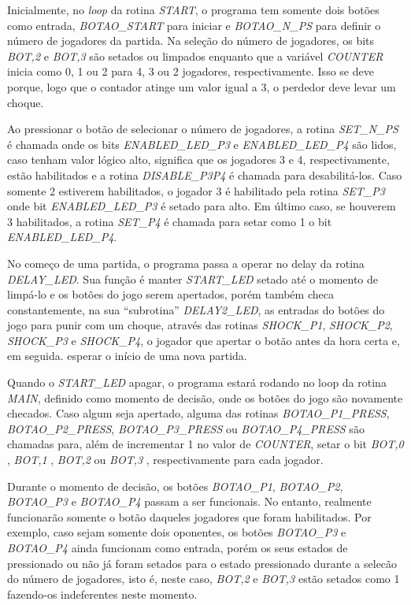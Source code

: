 \documentclass[article]{IEEEtran}
\begin{document}
Inicialmente, no \textit{loop} da rotina \textit{START}, o programa tem somente dois botões como entrada, \textit{BOTAO\_START} para iniciar e \textit{BOTAO\_N\_PS} para definir o número de jogadores da partida. Na seleção do número de jogadores, os bits \textit{BOT,2} e \textit{BOT,3} são setados ou limpados enquanto que a variável \textit{COUNTER} inicia como 0, 1 ou 2 para 4, 3 ou 2 jogadores, respectivamente. Isso se deve porque, logo que o contador atinge um valor igual a 3, o perdedor deve levar um choque.

Ao pressionar o botão de selecionar o número de jogadores, a rotina \textit{SET\_N\_PS} é chamada onde os bits \textit{ENABLED\_LED\_P3} e \textit{ENABLED\_LED\_P4} são lidos, caso tenham valor lógico alto, significa que os jogadores 3 e 4, respectivamente, estão habilitados e a rotina \textit{DISABLE\_P3P4} é chamada para desabilitá-los. Caso somente 2 estiverem habilitados, o jogador 3 é habilitado pela rotina \textit{SET\_P3} onde bit \textit{ENABLED\_LED\_P3} é setado para alto. Em último caso, se houverem 3 habilitados, a rotina \textit{SET\_P4} é chamada para setar como 1 o bit \textit{ENABLED\_LED\_P4}.

No começo de uma partida, o programa passa a operar no delay da rotina \textit{DELAY\_LED}. Sua função é manter \textit{START\_LED} setado até o momento de limpá-lo e os botões do jogo serem apertados, porém também checa constantemente, na sua ``subrotina'' \textit{DELAY2\_LED}, as entradas do botões do jogo para punir com um choque, através das rotinas \textit{SHOCK\_P1}, \textit{SHOCK\_P2}, \textit{SHOCK\_P3} e \textit{SHOCK\_P4}, o jogador que apertar o botão antes da hora certa e, em seguida. esperar o início de uma nova partida.

Quando o \textit{START\_LED} apagar, o programa estará rodando no loop da rotina \textit{MAIN}, definido como momento de decisão, onde os botões do jogo são novamente checados. Caso algum seja apertado, alguma das rotinas \textit{BOTAO\_P1\_PRESS}, \textit{BOTAO\_P2\_PRESS}, \textit{BOTAO\_P3\_PRESS} ou \textit{BOTAO\_P4\_PRESS} são chamadas para, além de incrementar 1 no valor de \textit{COUNTER}, setar o bit \textit{BOT,0} , \textit{BOT,1} , \textit{BOT,2} ou \textit{BOT,3} , respectivamente para cada jogador.

Durante o momento de decisão, os botões \textit{BOTAO\_P1}, \textit{BOTAO\_P2}, \textit{BOTAO\_P3} e \textit{BOTAO\_P4} passam a ser funcionais. No entanto, realmente funcionarão somente o botão daqueles jogadores que foram habilitados. Por exemplo, caso sejam somente dois oponentes, os botões \textit{BOTAO\_P3} e \textit{BOTAO\_P4} ainda funcionam como entrada, porém os seus estados de pressionado ou não já foram setados para o estado pressionado durante a selecão do número de jogadores, isto é, neste caso, \textit{BOT,2} e \textit{BOT,3} estão setados como 1 fazendo-os indeferentes neste momento.
\end{document}
